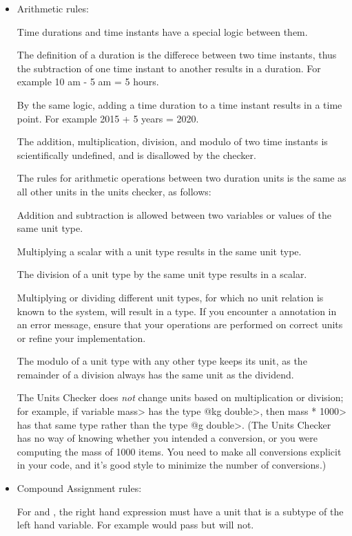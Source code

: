 \begin{itemize}
\item
Arithmetic rules:

Time durations and time instants have a special logic between them.

The definition of a duration is the differece between two time instants, thus
the subtraction of one time instant to another results in a duration.
For example 10 am - 5 am = 5 hours.

By the same logic, adding a time duration to a time instant results in a time
point. For example 2015 + 5 years = 2020.

The addition, multiplication, division, and modulo of two time instants is
scientifically undefined, and is disallowed by the checker.

The rules for arithmetic operations between two duration units is the same as
all other units in the units checker, as follows:

Addition and subtraction is allowed between two variables or values of
the same unit type.

Multiplying a scalar with a unit type results in the same unit type.

The division of a unit type by the same unit type results in a scalar.

Multiplying or dividing different unit types, for which no unit
relation is known to the system, will result in a 
type.
If you encounter a  annotation in an error message,
ensure that your operations are performed on correct units or refine
your  implementation.

The modulo of a unit type with any other type keeps its unit, as the remainder
of a division always has the same unit as the dividend.

The Units Checker does \emph{not} change units based on multiplication or
division; for example, if variable \<mass> has the type \<@kg double>, then
\<mass * 1000> has that same type rather than the type \<@g double>. (The
Units Checker has no way of knowing whether you intended a conversion, or you
were computing the mass of 1000 items.  You need to make all conversions
explicit in your code, and it's good style to minimize the number of
conversions.)

\item
Compound Assignment rules:

For \code{+=} and \code{-=}, the right hand expression must have a unit that
is a subtype of the left hand variable. For example 
would pass but  will not.


\end{itemize}
